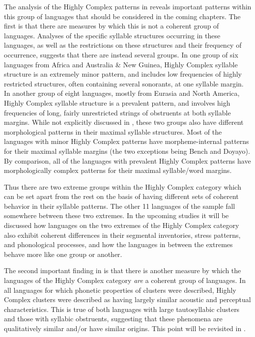 The analysis of the Highly Complex patterns in  reveals important patterns within this group of languages that should be considered in the coming chapters. The first is that there are measures by which this is not a coherent group of languages. Analyses of the specific syllable structures occurring in these languages, as well as the restrictions on these structures and their frequency of occurrence, suggests that there are instead several groups. In one group of six languages from Africa and Australia \& New Guinea, Highly Complex syllable structure is an extremely minor pattern, and includes low frequencies of highly restricted structures, often containing several sonorants, at one syllable margin. In another group of eight languages, mostly from Eurasia and North America, Highly Complex syllable structure is a prevalent pattern, and involves high frequencies of long, fairly unrestricted strings of obstruents at both syllable margins. While not explicitly discussed in , these two groups also have different morphological patterns in their maximal syllable structures. Most of the languages with minor Highly Complex patterns have morpheme-internal patterns for their maximal syllable margins (the two exceptions being Bench and Doyayo). By comparison, all of the languages with prevalent Highly Complex patterns have morphologically complex patterns for their maximal syllable/word margins.

Thus there are two extreme groups within the Highly Complex category which can be set apart from the rest on the basis of having different sets of coherent behavior in their syllable patterns. The other 11 languages of the sample fall somewhere between these two extremes. In the upcoming studies it will be discussed how languages on the two extremes of the Highly Complex category also exhibit coherent differences in their segmental inventories, stress patterns, and phonological processes, and how the languages in between the extremes behave more like one group or another.

The second important finding in  is that there is another measure by which the languages of the Highly Complex category \textit{are} a coherent group of languages. In all languages for which phonetic properties of clusters were described, Highly Complex clusters were described as having largely similar acoustic and perceptual characteristics. This is true of both languages with large tautosyllabic clusters and those with syllabic obstruents, suggesting that these phenomena are qualitatively similar and/or have similar origins. This point will be revisited in .

